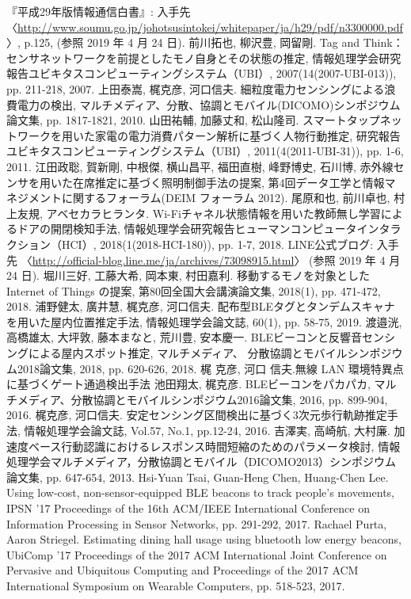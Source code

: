 \documentclass[Japanese]{dicomopapers}
\begin{document}
\begin{thebibliography}{20}
 『平成29年版情報通信白書』: 入手先 〈\url{http://www.soumu.go.jp/johotsusintokei/whitepaper/ja/h29/pdf/n3300000.pdf}〉, p.125, (参照 2019 年 4 月 24 日).
 前川拓也, 柳沢豊, 岡留剛. Tag and Think：センサネットワークを前提としたモノ自身とその状態の推定, 情報処理学会研究報告ユビキタスコンピューティングシステム（UBI）, 2007(14(2007-UBI-013)), pp. 211-218, 2007.
 上田泰嵩, 梶克彦, 河口信夫. 細粒度電力センシングによる浪費電力の検出, マルチメディア、分散、協調とモバイル(DICOMO)シンポジウム論文集, pp. 1817-1821, 2010.
 山田祐輔, 加藤丈和, 松山隆司. スマートタップネットワークを用いた家電の電力消費パターン解析に基づく人物行動推定, 研究報告ユビキタスコンピューティングシステム（UBI）, 2011(4(2011-UBI-31)), pp. 1-6, 2011.
 江田政聡, 賀新剛, 中根傑, 横山昌平, 福田直樹, 峰野博史, 石川博, 赤外線センサを用いた在席推定に基づく照明制御手法の提案, 第4回データ工学と情報マネジメントに関するフォーラム(DEIM フォーラム 2012).
 尾原和也, 前川卓也, 村上友規, アベセカラヒランタ. Wi-Fiチャネル状態情報を用いた教師無し学習によるドアの開閉検知手法, 情報処理学会研究報告ヒューマンコンピュータインタラクション（HCI）, 2018(1(2018-HCI-180)), pp. 1-7, 2018.
 LINE公式ブログ: 入手先 〈\url{http://official-blog.line.me/ja/archives/73098915.html}〉 (参照 2019 年 4 月 24 日).
 堀川三好, 工藤大希, 岡本東, 村田嘉利. 移動するモノを対象とした Internet of Things の提案, 第80回全国大会講演論文集, 2018(1), pp. 471-472, 2018.
 浦野健太, 廣井慧, 梶克彦, 河口信夫. 配布型BLEタグとタンデムスキャナを用いた屋内位置推定手法, 情報処理学会論文誌, 60(1), pp. 58-75, 2019.
 渡邉洸, 高橋雄太, 大坪敦, 藤本まなと, 荒川豊, 安本慶一. BLEビーコンと反響音センシングによる屋内スポット推定, マルチメディア、 分散協調とモバイルシンポジウム2018論文集, 2018, pp. 620-626, 2018.
 梶 克彦, 河口 信夫.無線 LAN 環境特異点に基づくゲート通過検出手法
 池田翔太, 梶克彦. BLEビーコンをパカパカ, マルチメディア、分散協調とモバイルシンポジウム2016論文集, 2016, pp. 899-904, 2016.
 梶克彦, 河口信夫. 安定センシング区間検出に基づく3次元歩行軌跡推定手法, 情報処理学会論文誌, Vol.57, No.1, pp.12-24, 2016.
 吉澤実, 高崎航, 大村廉. 加速度ベース行動認識におけるレスポンス時間短縮のためのパラメータ検討, 情報処理学会マルチメディア，分散協調とモバイル（DICOMO2013）シンポジウム論文集, pp. 647-654, 2013.
 Hsi-Yuan Tsai, Guan-Heng Chen, Huang-Chen Lee. Using low-cost, non-sensor-equipped BLE beacons to track people's movements, IPSN '17 Proceedings of the 16th ACM/IEEE International Conference on Information Processing in Sensor Networks, pp. 291-292, 2017.
 Rachael Purta, Aaron Striegel. Estimating dining hall usage using bluetooth low energy beacons, UbiComp '17 Proceedings of the 2017 ACM International Joint Conference on Pervasive and Ubiquitous Computing and Proceedings of the 2017 ACM International Symposium on Wearable Computers, pp. 518-523, 2017.
\end{thebibliography}
\end{document}

